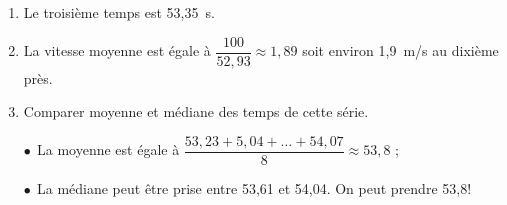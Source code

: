 
\medskip

%

\begin{enumerate}
\item %
Le troisième temps est 53,35~s.
\item %
La vitesse moyenne est égale à $\dfrac{100}{52,93} \approx 1,89$ soit environ 1,9~m/s au dixième près.
\item Comparer moyenne et médiane des temps de cette série.

$\bullet~~$La moyenne est égale à $\dfrac{53,23 + 5,04 + \ldots + 54,07}{8}  \approx 53,8$ ;

$\bullet~~$La médiane peut être prise entre 53,61 et 54,04. On peut prendre 53,8!

\medskip




\end{enumerate}

